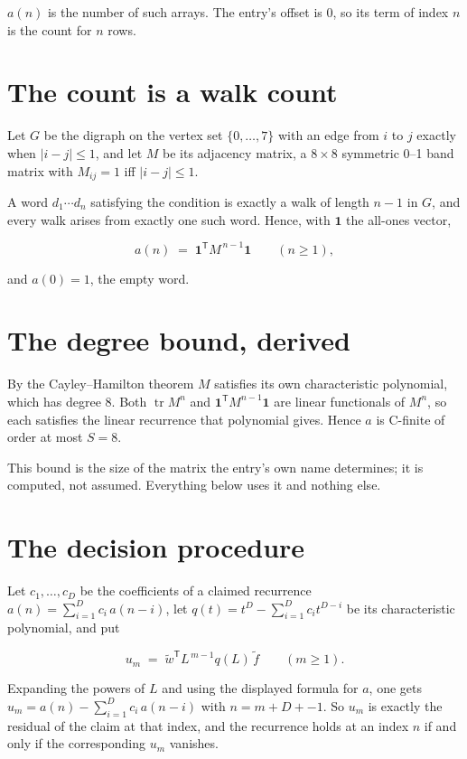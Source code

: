 \documentclass[11pt]{article}
\theoremstyle{definition}
\begin{document}
$a(n)$ is the number of such arrays. The entry's offset is 0, so its term of index $n$ is the count for $n$ rows.

\section{The count is a walk count}

Let $G$ be the digraph on the vertex set $\{0,\dots,7\}$ with an edge from $i$ to $j$ exactly when $|i-j| \le 1$, and let $M$ be its adjacency matrix, a $8 \times 8$ symmetric 0--1 band matrix with $M_{ij} = 1$ iff $|i-j| \le 1$.

A word $d_1\cdots d_n$ satisfying the condition is exactly a walk of length $n-1$ in $G$, and every walk arises from exactly one such word. Hence, with $\mathbf 1$ the all-ones vector,

\[a(n) \;=\; \mathbf 1^{\mathsf T} M^{\,n-1} \mathbf 1 \qquad (n \ge 1),\]

and $a(0) = 1$, the empty word.

\section{The degree bound, derived}

By the Cayley--Hamilton theorem $M$ satisfies its own characteristic polynomial, which has degree $8$. Both $\operatorname{tr} M^n$ and $\mathbf 1^{\mathsf T} M^{n-1} \mathbf 1$ are linear functionals of $M^{n}$, so each satisfies the linear recurrence that polynomial gives. Hence $a$ is C-finite of order at most $S = 8$.

This bound is the size of the matrix the entry's own name determines; it is computed, not assumed. Everything below uses it and nothing else.

\section{The decision procedure}

Let $c_1,\dots,c_D$ be the coefficients of a claimed recurrence $a(n) = \sum_{i=1}^{D} c_i\,a(n-i)$, let $q(t) = t^{D} - \sum_{i=1}^{D} c_i t^{D-i}$ be its characteristic polynomial, and put

\[u_m \;=\; \tilde w^{\mathsf T} L^{\,m-1} q(L)\,\tilde f \qquad (m \ge 1).\]

Expanding the powers of $L$ and using the displayed formula for $a$, one gets $u_m = a(n) - \sum_{i=1}^{D} c_i\,a(n-i)$ with $n = m + D + -1$. So $u_m$ is exactly the residual of the claim at that index, and the recurrence holds at an index $n$ if and only if the corresponding $u_m$ vanishes.
\end{document}
